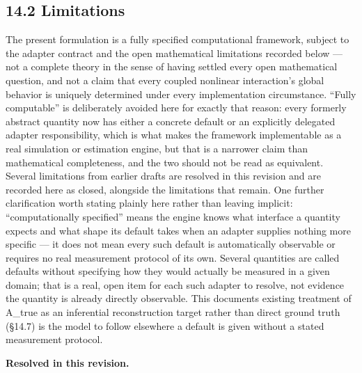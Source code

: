 \documentclass[
]{article}
\begin{document}
\hypertarget{limitations}{%
\subsection{14.2 Limitations}\label{limitations}}

The present formulation is a fully specified computational framework,
subject to the adapter contract and the open mathematical limitations
recorded below --- not a complete theory in the sense of having settled
every open mathematical question, and not a claim that every coupled
nonlinear interaction's global behavior is uniquely determined under
every implementation circumstance. ``Fully computable'' is deliberately
avoided here for exactly that reason: every formerly abstract quantity
now has either a concrete default or an explicitly delegated adapter
responsibility, which is what makes the framework implementable as a
real simulation or estimation engine, but that is a narrower claim than
mathematical completeness, and the two should not be read as equivalent.
Several limitations from earlier drafts are resolved in this revision
and are recorded here as closed, alongside the limitations that remain.
One further clarification worth stating plainly here rather than leaving
implicit: ``computationally specified'' means the engine knows what
interface a quantity expects and what shape its default takes when an
adapter supplies nothing more specific --- it does not mean every such
default is automatically observable or requires no real measurement
protocol of its own. Several quantities are called defaults without
specifying how they would actually be measured in a given domain; that
is a real, open item for each such adapter to resolve, not evidence the
quantity is already directly observable. This documents existing
treatment of A\_true as an inferential reconstruction target rather than
direct ground truth (§14.7) is the model to follow elsewhere a default
is given without a stated measurement protocol.

\textbf{Resolved in this revision.}
\end{document}
